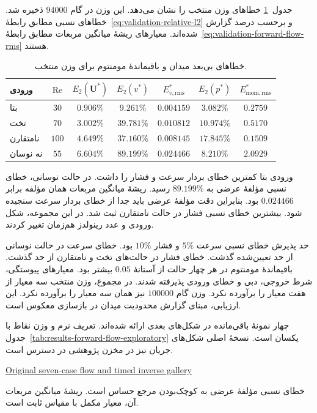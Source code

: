 جدول~\ref{tab:results-forward-flow-errors} خطاهای وزن منتخب را نشان می‌دهد.
این وزن در گام $94000$ ذخیره شد.
خطاهای نسبی مطابق رابطهٔ~\eqref{eq:validation-relative-l2} و برحسب درصد گزارش شده‌اند.
معیارهای ریشهٔ میانگین مربعات مطابق رابطهٔ~\eqref{eq:validation-forward-flow-rms} هستند.

\begin{table}[htbp]
\centering
\small
\setlength{\tabcolsep}{4pt}
\caption{خطاهای بی‌بعد میدان و باقیماندهٔ مومنتوم برای وزن منتخب.}
\label{tab:results-forward-flow-errors}
\begin{tabular}{@{}lcccccc@{}}
\hline
ورودی & $\mathrm{Re}$ & $E_2(\mathbf U^*)$ & $E_2(v^*)$ &
$E_{v,\mathrm{rms}}^*$ & $E_2(p^*)$ & $E_{\mathrm{mom,rms}}^*$ \\
\hline
بتا & $30$ & $0.906\%$ & $9.261\%$ & $0.004159$ & $3.082\%$ & $0.2759$ \\
تخت & $70$ & $3.002\%$ & $39.781\%$ & $0.010812$ & $10.974\%$ & $0.5170$ \\
نامتقارن & $100$ & $4.649\%$ & $37.160\%$ & $0.008145$ & $17.845\%$ & $0.1509$ \\
نه نوسان & $55$ & $6.604\%$ & $89.199\%$ & $0.024466$ & $8.210\%$ & $2.0929$ \\
\hline
\end{tabular}
\end{table}

ورودی بتا کمترین خطای بردار سرعت و فشار را داشت.
در حالت نوسانی، خطای نسبی مؤلفهٔ عرضی به $89.199\%$ رسید.
ریشهٔ میانگین مربعات همان مؤلفه برابر $0.024466$ بود.
بنابراین دقت مؤلفهٔ عرضی باید جدا از خطای بردار سرعت سنجیده شود.
بیشترین خطای نسبی فشار در حالت نامتقارن ثبت شد.
در این مجموعه، شکل ورودی و عدد رینولدز هم‌زمان تغییر کردند.

حد پذیرش خطای نسبی سرعت $5\%$ و فشار $10\%$ بود.
خطای سرعت در حالت نوسانی از حد تعیین‌شده گذشت.
خطای فشار در حالت‌های تخت و نامتقارن از حد گذشت.
باقیماندهٔ مومنتوم در هر چهار حالت از آستانهٔ $0.05$ بیشتر بود.
معیارهای پیوستگی، شرط خروجی، دبی و خطای ورودی پذیرفته شدند.
در مجموع، وزن منتخب سه معیار از هفت معیار را برآورده نکرد.
وزن گام $100000$ نیز همان سه معیار را برآورده نکرد.
این ارزیابی، مبنای گزارش محدودیت میدان در بازسازی معکوس است.


\FloatBarrier
{}
\label{sec:appendix-forward}

چهار نمونهٔ باقی‌مانده در شکل‌های بعدی ارائه شده‌اند.
تعریف نرم و وزن نقاط با جدول~\ref{tab:results-forward-flow-exploratory} یکسان است.
نسخهٔ اصلی شکل‌های جریان نیز در مخزن پژوهشی در دسترس است.
\begin{latin}
\small
\href{https://github.com/mohrezsayeh90-ai/inverse_fromtrajectory_to_FlowReconstruction/blob/92897a6962e537a4bea88042609be102095db037/results/diverse_profiles_2026_11_07/all_new_figures.pdf}{Original seven-case flow and timed inverse gallery}
\end{latin}
خطای نسبی مؤلفهٔ عرضی به کوچک‌بودن مرجع حساس است.
ریشهٔ میانگین مربعات آن، معیار مکمل با مقیاس ثابت است.

